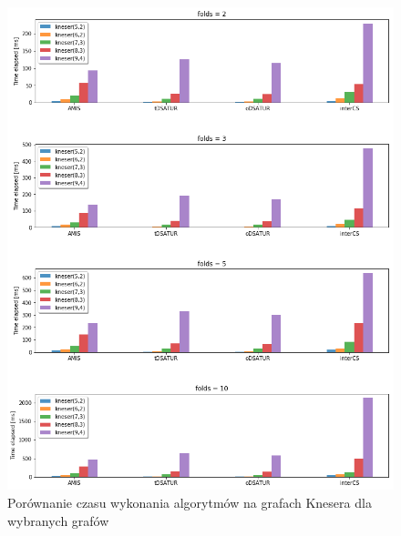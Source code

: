 \documentclass[10pt,a4paper]{article}
\begin{document}
	\vspace*{\fill}
	\begin{figure}[H]
		\begin{center}
			\includegraphics[width=\textwidth]{images/tests/kneser_graphs/performance_per_graph.png}
			\caption{Porównanie czasu wykonania algorytmów na grafach Knesera dla wybranych grafów}
		\end{center}
	\end{figure}
	\vspace*{\fill}
	
	\pagebreak
	
\end{document}
